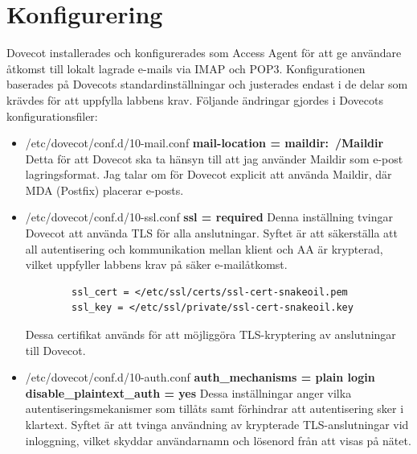 \documentclass{report}
\begin{document}
\section{Konfigurering}
Dovecot installerades och konfigurerades som Access Agent för att ge användare åtkomst till 
lokalt lagrade e-mails via IMAP och POP3. Konfigurationen baserades på Dovecots standardinställningar 
och justerades endast i de delar som krävdes för att uppfylla labbens krav.
\newline\newline
Följande ändringar gjordes i Dovecots konfigurationsfiler:
\begin{itemize}
    \item /etc/dovecot/conf.d/10-mail.conf\newline
    \textbf{mail-location = maildir:~/Maildir}\newline
    Detta för att Dovecot ska ta hänsyn till att jag använder Maildir som 
    e-post lagringsformat. Jag talar om för Dovecot explicit att använda Maildir, där MDA (Postfix) placerar e-posts.
    \item /etc/dovecot/conf.d/10-ssl.conf\newline
    \textbf{ssl = required}\newline
    Denna inställning tvingar Dovecot att använda TLS för alla anslutningar.
    Syftet är att säkerställa att all autentisering och kommunikation mellan 
    klient och AA är krypterad, vilket uppfyller labbens krav på säker e-mailåtkomst.\newline
    \begin{verbatim}
        ssl_cert = </etc/ssl/certs/ssl-cert-snakeoil.pem
        ssl_key = </etc/ssl/private/ssl-cert-snakeoil.key
    \end{verbatim}
    Dessa certifikat används för att möjliggöra TLS-kryptering av anslutningar till Dovecot.
    \item /etc/dovecot/conf.d/10-auth.conf\newline
    \textbf{auth\_mechanisms = plain login} \newline
    \textbf{disable\_plaintext\_auth = yes} \newline
    Dessa inställningar anger vilka autentiseringsmekanismer som tillåts samt
    förhindrar att autentisering sker i klartext. Syftet är att tvinga användning
    av krypterade TLS-anslutningar vid inloggning, vilket skyddar användarnamn
    och lösenord från att visas på nätet.
    
\end{itemize}
\end{document}
